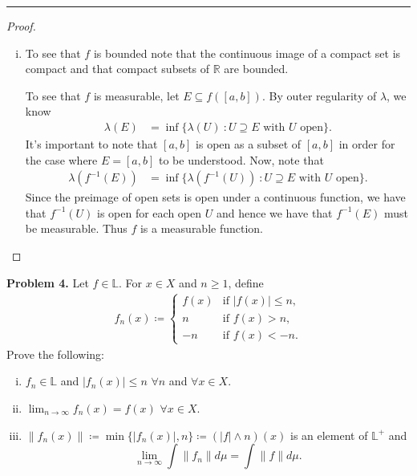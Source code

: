\documentclass[leqno]{article}
\theoremstyle{nonumberplain}
\newtheorem{proof}{Proof}
\newcommand{\R}{\mathbb{R}}
\begin{document}
\noindent\rule[0.5ex]{\linewidth}{1pt}

\begin{proof}~
\begin{enumerate}[(i)]
\item To see that $f$ is bounded note that the continuous image of a compact set is compact and that compact subsets of $\R$ are bounded.  

To see that $f$ is measurable, let $E\subseteq f([a,b])$. By outer regularity of $\lambda$, we know
\begin{align*}
\lambda(E)&= \inf \{\lambda(U) ~\colon U\supseteq E \textrm{ with $U$ open}\}.
\end{align*}
It's important to note that $[a,b]$ is open as a subset of $[a,b]$ in order for the case where $E=[a,b]$ to be understood.  Now, note that
\begin{align*}
\lambda(f^{-1}(E))&= \inf \{\lambda(f^{-1}(U)) ~ \colon U\supseteq E \textrm{ with $U$ open}\}.
\end{align*}
Since the preimage of open sets is open under a continuous function, we have that $f^{-1}(U)$ is open for each open $U$ and hence we have that $f^{-1}(E)$ must be measurable. Thus $f$ is a measurable function.
\end{enumerate}
\end{proof}

\pagebreak




\noindent\textbf{Problem 4.} \quad
Let $f\in \mathbb{L}$. For $x\in X$ and $n\geq 1$, define
\begin{align*}
f_n(x)\coloneqq 
\begin{cases}
f(x) & \textrm{if } |f(x)|\leq n,\\
n & \textrm{if } f(x)>n,\\
-n & \textrm{if } f(x)<-n. 
\end{cases}
\end{align*}
Prove the following:
\begin{enumerate}[(i)]
\item $f_n\in \mathbb{L}$ and $|f_n(x)|\leq n$ $\forall n$ and $\forall x \in X$.
\item $\lim_{n\to \infty} f_n(x)=f(x)$ $\forall x \in X$.
\item $\|f_n(x)\|\coloneqq \min\{|f_n(x)|,n\}\coloneqq (|f|\wedge n)(x)$ is an element of $\mathbb{L}^+$ and 
\[
\lim_{n\to \infty} \int \|f_n\|d\mu = \int \|f\|d\mu.
\]
\end{enumerate}
\end{document}
